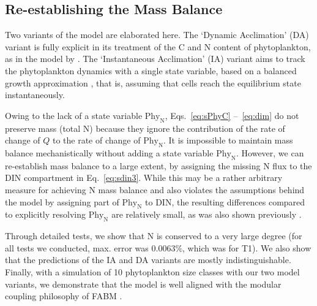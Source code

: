\documentclass[gmd, manuscript]{copernicus}
\newcommand{\onur}[1]{\textcolor{blue}{\{Onur: #1\}}}
\newcommand{\markus}[1]{\textcolor{blue}{\{Markus: #1\}}}
\begin{document}
\subsection{Re-establishing the Mass Balance}

Two variants of the model are elaborated here. The `Dynamic Acclimation' (DA) variant is fully explicit in its treatment of the C and N content of phytoplankton, as in the model by \citet{Fernandez-Castro2016}. 
The `Instantaneous Acclimation' (IA) variant aims to track the phytoplankton dynamics with a single state variable, based on a balanced growth approximation \citep{Burmaster1979}, that is, assuming that cells reach the equilibrium state instantaneously.

Owing to the lack of a state variable $\text{Phy}_{\text{N}}$, Eqs.~\eqref{eq:sPhyC} --~\eqref{eq:dim} do not preserve mass (total N) because they ignore the contribution of the rate of change of $Q$ to the rate of change of $\text{Phy}_{\text{N}}$.  It is impossible to maintain mass balance mechanistically without adding a state variable $\text{Phy}_{\text{N}}$.  However, we can re-establish mass balance to a large extent, by assigning the missing N flux to the DIN compartment in Eq.~\eqref{eq:sdin3}.  While this may be a rather arbitrary measure for achieving N mass balance and also violates the assumptions behind the model by assigning part of $\text{Phy}_{\text{N}}$ to DIN, the resulting differences compared to explicitly resolving $\text{Phy}_{\text{N}}$ are relatively small, as was also shown previously \citep{Ward2017}.

Through detailed tests, we show that N is conserved 
to a very large degree (for all tests we conducted, max. error was $0.0063\%$, which was for T1). 
We also show that the predictions of the IA and DA variants are mostly indistinguishable. Finally, with a simulation of 10 phytoplankton size classes with our two model variants, we demonstrate that the model is well aligned with the modular coupling philosophy of FABM \citep{Bruggeman2014}.
\end{document}
